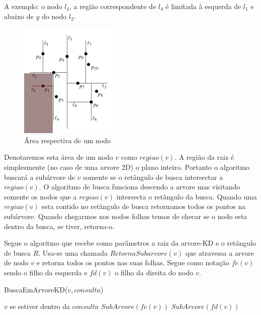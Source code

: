 A exemplo: o nodo \(l_4\), a região correspondente de \(l_4\) é limitada à esquerda de
\(l_1\) e abaixo de \(y\) do nodo \(l_2\).

\begin{figure}[htb]
    \caption{\label{fig:Fig_4} Área respectiva de um nodo}
    \begin{center}
        \includegraphics{images/kd_tree2.png}
    \end{center}
\end{figure}

Denotaremos esta área de um nodo \(v\) como \(regiao(v)\). A região da raiz é simplesmente
(no caso de uma arvore 2D) o plano inteiro.
Portanto o algoritmo buscará a subárvore de \(v\) somente se o retângulo de busca intersectar
a \(regiao(v)\).
O algoritmo de busca funciona descendo a arvore mas visitando somente os nodos que a
\(regiao(v)\) intersecta o retângulo da busca. Quando uma \(regiao(v)\) esta contido no
retângulo de busca retornamos todos os pontos na subárvore.
Quando chegarmos nos nodos folhas temos de checar se o nodo esta dentro da busca, se tiver,
retorna-o.

Segue o algoritmo que recebe como parâmetros a raiz da arvore-KD e o retângulo de busca \(R\).
Usa-se uma chamada \(RetornaSubarvore(v)\) que atravessa a arvore de nodo \(v\) e retorna
todos os pontos nas suas folhas. Segue como notação \(fe(v)\) sendo o filho da esquerda e
\(fd(v)\) o filho da direita do nodo \(v\).


\begin{algorithm}
    \caption{BuscaEmArvoreKD($v, consulta$)}
    \begin{algorithmic}[1]
        \Return  $v$ se estiver dentro da $consulta$
        \Else
            \State \Return $SubArvore( fe(v) )$
            \Else
                \State {}
                \EndIf
            \EndIf
            \State \Return $SubArvore(fd(v))$
            \Else
                \State {}
                \EndIf
            \EndIf
        \EndIf
    \EndFunction
    \end{algorithmic}
\end{algorithm}

